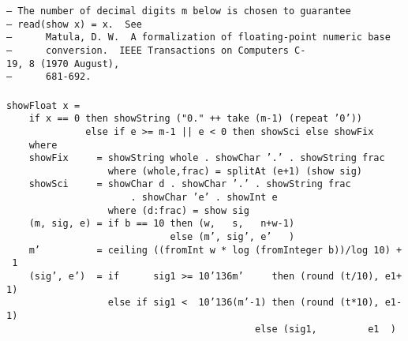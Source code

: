 \mbox{\tt --\ The\ number\ of\ decimal\ digits\ m\ below\ is\ chosen\ to\ guarantee\ }\\
\mbox{\tt --\ read(show\ x)\ =\ x.\ \ See}\\
\mbox{\tt --\ \ \ \ \ \ Matula,\ D.\ W.\ \ A\ formalization\ of\ floating-point\ numeric\ base}\\
\mbox{\tt --\ \ \ \ \ \ conversion.\ \ IEEE\ Transactions\ on\ Computers\ C-19,\ 8\ (1970\ August),}\\
\mbox{\tt --\ \ \ \ \ \ 681-692.}\\
\mbox{\tt }\\[-8pt]
\mbox{\tt showFloat\ x\ =}\\
\mbox{\tt \ \ \ \ if\ x\ ==\ 0\ then\ showString\ ("0."\ ++\ take\ (m-1)\ (repeat\ '0'))}\\
\mbox{\tt \ \ \ \ \ \ \ \ \ \ \ \ \ \ else\ if\ e\ >=\ m-1\ ||\ e\ <\ 0\ then\ showSci\ else\ showFix}\\
\mbox{\tt \ \ \ \ where}\\
\mbox{\tt \ \ \ \ showFix\ \ \ \ \ =\ showString\ whole\ .\ showChar\ '.'\ .\ showString\ frac}\\
\mbox{\tt \ \ \ \ \ \ \ \ \ \ \ \ \ \ \ \ \ \ where\ (whole,frac)\ =\ splitAt\ (e+1)\ (show\ sig)}\\
\mbox{\tt \ \ \ \ showSci\ \ \ \ \ =\ showChar\ d\ .\ showChar\ '.'\ .\ showString\ frac}\\
\mbox{\tt \ \ \ \ \ \ \ \ \ \ \ \ \ \ \ \ \ \ \ \ \ \ .\ showChar\ 'e'\ .\ showInt\ e}\\
\mbox{\tt \ \ \ \ \ \ \ \ \ \ \ \ \ \ \ \ \ \ where\ (d:frac)\ =\ show\ sig}\\
\mbox{\tt \ \ \ \ (m,\ sig,\ e)\ =\ if\ b\ ==\ 10\ then\ (w,\ \ \ s,\ \ \ n+w-1)}\\
\mbox{\tt \ \ \ \ \ \ \ \ \ \ \ \ \ \ \ \ \ \ \ \ \ \ \ \ \ \ \ \ \ else\ (m',\ sig',\ e'\ \ \ )}\\
\mbox{\tt \ \ \ \ m'\ \ \ \ \ \ \ \ \ \ =\ ceiling\ ((fromInt\ w\ *\ log\ (fromInteger\ b))/log\ 10)\ +\ 1}\\
\mbox{\tt \ \ \ \ (sig',\ e')\ \ =\ if\ \ \ \ \ \ sig1\ >=\ 10{\char'136}m'\ \ \ \ \ then\ (round\ (t/10),\ e1+1)}\\
\mbox{\tt \ \ \ \ \ \ \ \ \ \ \ \ \ \ \ \ \ \ else\ if\ sig1\ <\ \ 10{\char'136}(m'-1)\ then\ (round\ (t*10),\ e1-1)}\\
\mbox{\tt \ \ \ \ \ \ \ \ \ \ \ \ \ \ \ \ \ \ \ \ \ \ \ \ \ \ \ \ \ \ \ \ \ \ \ \ \ \ \ \ \ \ \ \ else\ (sig1,\ \ \ \ \ \ \ \ \ e1\ \ )}\\
